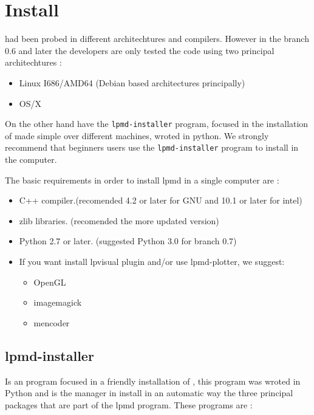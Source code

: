 \chapter{Install}
\label{chap:inst}

{\lpmd} had been probed in different architechtures and compilers. However in
the branch 0.6 and later the developers are only tested the code using two
principal architechtures :

\begin{itemize}
 \item Linux I686/AMD64 (Debian based architectures principally)
 \item OS/X
\end{itemize}

On the other hand {\lpmd} have the \verb|lpmd-installer|
program, focused in the installation of {\lpmd} made simple over different
machines, wroted in python. We strongly recommend that beginners users use the
\verb|lpmd-installer| program to install {\lpmd} in the computer.

The basic requirements in order to install lpmd in a single computer are :

\begin{itemize}
 \item C++ compiler.(recomended 4.2 or later for GNU and 10.1 or later for
intel)
 \item zlib libraries. (recomended the more updated version)
 \item Python 2.7 or later. (suggested Python 3.0 for branch 0.7)
 \item If you want install lpvisual plugin and/or use lpmd-plotter, we suggest:
 \begin{itemize}
  \item OpenGL
  \item imagemagick
  \item mencoder
 \end{itemize}
\end{itemize} 

\section{lpmd-installer}

Is an program focused in a friendly installation of {\lpmd}, this program was
wroted in Python and is the manager in install in an automatic way the three
principal packages that are part of the lpmd program. These programs are :

